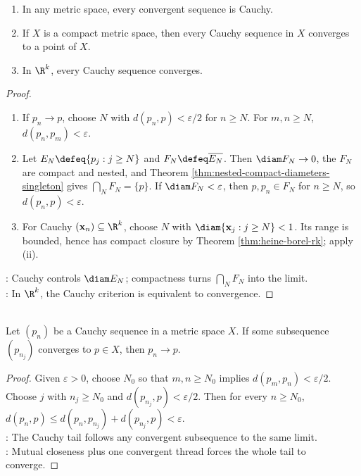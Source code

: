 \begin{theorem} \label{thm:cauchy-convergence-criterion}\label{thm:sequences-completeness-main-source-todo} 
\begin{enumerate}[label=(\roman*)]
\setlength{\itemsep}{0pt}
\item In any metric space, every convergent sequence is Cauchy.
\item If $X$ is a compact metric space, then every Cauchy sequence in $X$ converges to a point of $X$.
\item In $\R^k$, every Cauchy sequence converges.
\end{enumerate}
\begin{proof}
\begin{enumerate}[label=(\roman*)]
\setlength{\itemsep}{0pt}
\item If $p_n\to p$, choose $N$ with $d(p_n,p)<\varepsilon/2$ for $n\geq N$. For $m,n\geq N$, $d(p_n,p_m)<\varepsilon$.
\item Let $E_N\defeq\{p_j:j\geq N\}$ and $F_N\defeq\overline{E_N}$. Then $\diam F_N\to0$, the $F_N$ are compact and nested, and Theorem \ref{thm:nested-compact-diameters-singleton} gives $\bigcap_NF_N=\{p\}$. If $\diam F_N<\varepsilon$, then $p,p_n\in F_N$ for $n\geq N$, so $d(p_n,p)<\varepsilon$.
\item For Cauchy $(\mathbf{x}_n)\subseteq\R^k$, choose $N$ with $\diam\{\mathbf{x}_j:j\geq N\}<1$. Its range is bounded, hence has compact closure by Theorem \ref{thm:heine-borel-rk}; apply (ii).
\end{enumerate}
: Cauchy controls $\diam E_N$; compactness turns $\bigcap_NF_N$ into the limit.\\
: In $\R^k$, the Cauchy criterion is equivalent to convergence.
\end{proof}
\end{theorem}

\begin{lemma} \label{lem:cauchy-sequence-with-convergent-subsequence} \\
Let $(p_n)$ be a Cauchy sequence in a metric space $X$. If some subsequence $(p_{n_j})$ converges to $p\in X$, then $p_n\to p$.
\begin{proof}
Given $\varepsilon>0$, choose $N_0$ so that $m,n\geq N_0$ implies $d(p_m,p_n)<\varepsilon/2$. Choose $j$ with $n_j\geq N_0$ and $d(p_{n_j},p)<\varepsilon/2$. Then for every $n\geq N_0$, $d(p_n,p)\leq d(p_n,p_{n_j})+d(p_{n_j},p)<\varepsilon$.\\
: The Cauchy tail follows any convergent subsequence to the same limit.\\
: Mutual closeness plus one convergent thread forces the whole tail to converge.
\end{proof}
\end{lemma}

